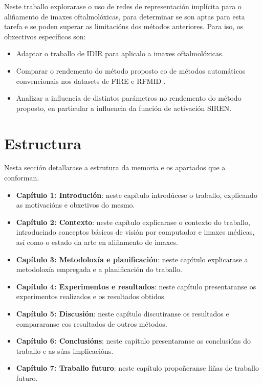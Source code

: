 Neste traballo explorarase o uso de redes de representación implícita para o aliñamento de imaxes oftalmolóxicas, para determinar se son aptas para esta tarefa e se poden superar as limitacións dos métodos anteriores.
Para iso, os obxectivos específicos son:
\begin{itemize}
    \item Adaptar o traballo de IDIR \cite{wolterink2021implicit} para aplicalo a imaxes oftalmolóxicas.
    \item Comparar o rendemento do método proposto co de métodos automáticos convencionais nos datasets de FIRE \cite{FIRE} e RFMID \cite{RFMiD}.
    \item Analizar a influencia de distintos parámetros no rendemento do método proposto, en particular a influencia da función de activación SIREN.
\end{itemize}

\section{Estructura }

Nesta sección detallarase a estrutura da memoria e os apartados que a conforman.

\begin{itemize}
    \item \textbf{Capítulo 1: Introdución}: neste capítulo introdúcese o traballo, explicando as motivacións e obxetivos do mesmo.
    \item \textbf{Capítulo 2: Contexto}: neste capítulo explicarase o contexto do traballo, introducindo conceptos básicos de visión por computador e imaxes médicas, así como o estado da arte en aliñamento de imaxes.
    \item \textbf{Capítulo 3: Metodoloxía e planificación}: neste capítulo explicarase a metodoloxía empregada e a planificación do traballo.
    \item \textbf{Capítulo 4: Experimentos e resultados}: neste capítulo presentaranse os experimentos realizados e os resultados obtidos.
    \item \textbf{Capítulo 5: Discusión}: neste capítulo discutiranse os resultados e compararanse cos resultados de outros métodos.
    \item \textbf{Capítulo 6: Conclusións}: neste capítulo presentaranse as conclusións do traballo e as súas implicacións.
    \item \textbf{Capítulo 7: Traballo futuro}: neste capítulo propoñeranse liñas de traballo futuro.
\end{itemize}

